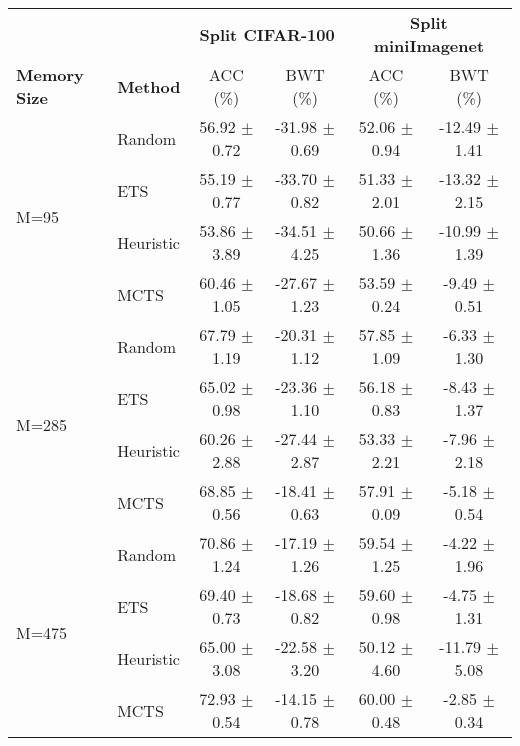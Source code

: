 \begin{tabular}{llcccc}
\toprule
                        &                 & \multicolumn{2}{c}{\textbf{Split CIFAR-100}} & \multicolumn{2}{c}{\textbf{Split miniImagenet}} \\
\cmidrule(lr){3-4} \cmidrule(lr){5-6}
\textbf{Memory Size}    & \textbf{Method} & ACC (\%)             & BWT (\%)              & ACC (\%)               & BWT (\%)               \\
\midrule
\multirow{4}{*}{M=95}   & Random          & 56.92 $\pm$ 0.72       & -31.98 $\pm$ 0.69       & 52.06 $\pm$ 0.94         & -12.49 $\pm$ 1.41        \\
                        & ETS             & 55.19 $\pm$ 0.77       & -33.70 $\pm$ 0.82       & 51.33 $\pm$ 2.01         & -13.32 $\pm$ 2.15        \\
                        & Heuristic         & 53.86 $\pm$ 3.89       & -34.51 $\pm$ 4.25       & 50.66 $\pm$ 1.36         & -10.99 $\pm$ 1.39        \\
                        & MCTS            & 60.46 $\pm$ 1.05       & -27.67 $\pm$ 1.23       & 53.59 $\pm$ 0.24         & -9.49 $\pm$ 0.51         \\
\midrule
\multirow{4}{*}{M=285}  & Random          & 67.79 $\pm$ 1.19       & -20.31 $\pm$ 1.12       & 57.85 $\pm$ 1.09         & -6.33 $\pm$ 1.30         \\
                        & ETS             & 65.02 $\pm$ 0.98       & -23.36 $\pm$ 1.10       & 56.18 $\pm$ 0.83         & -8.43 $\pm$ 1.37         \\
                        & Heuristic         & 60.26 $\pm$ 2.88       & -27.44 $\pm$ 2.87       & 53.33 $\pm$ 2.21         & -7.96 $\pm$ 2.18         \\
                        & MCTS            & 68.85 $\pm$ 0.56       & -18.41 $\pm$ 0.63       & 57.91 $\pm$ 0.09         & -5.18 $\pm$ 0.54         \\
\midrule
\multirow{4}{*}{M=475}  & Random          & 70.86 $\pm$ 1.24       & -17.19 $\pm$ 1.26       & 59.54 $\pm$ 1.25         & -4.22 $\pm$ 1.96         \\
                        & ETS             & 69.40 $\pm$ 0.73       & -18.68 $\pm$ 0.82       & 59.60 $\pm$ 0.98         & -4.75 $\pm$ 1.31         \\
                        & Heuristic         & 65.00 $\pm$ 3.08       & -22.58 $\pm$ 3.20       & 50.12 $\pm$ 4.60         & -11.79 $\pm$ 5.08        \\
                        & MCTS            & 72.93 $\pm$ 0.54       & -14.15 $\pm$ 0.78       & 60.00 $\pm$ 0.48         & -2.85 $\pm$ 0.34         \\

\end{tabular}
